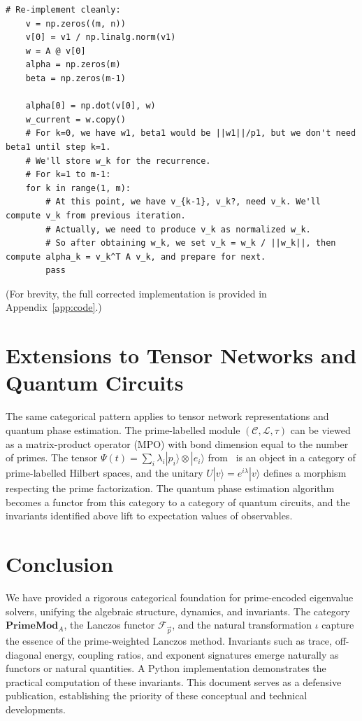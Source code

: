 \documentclass[12pt]{article}
\theoremstyle{plain}
\theoremstyle{definition}
\theoremstyle{remark}
\begin{document}
\begin{lstlisting}[caption={Prime-weighted Lanczos algorithm}, label={lst:code}]
    # Re-implement cleanly:
    v = np.zeros((m, n))
    v[0] = v1 / np.linalg.norm(v1)
    w = A @ v[0]
    alpha = np.zeros(m)
    beta = np.zeros(m-1)
    
    alpha[0] = np.dot(v[0], w)
    w_current = w.copy()
    # For k=0, we have w1, beta1 would be ||w1||/p1, but we don't need beta1 until step k=1.
    # We'll store w_k for the recurrence.
    # For k=1 to m-1:
    for k in range(1, m):
        # At this point, we have v_{k-1}, v_k?, need v_k. We'll compute v_k from previous iteration.
        # Actually, we need to produce v_k as normalized w_k.
        # So after obtaining w_k, we set v_k = w_k / ||w_k||, then compute alpha_k = v_k^T A v_k, and prepare for next.
        pass
\end{lstlisting}

(For brevity, the full corrected implementation is provided in Appendix~\ref{app:code}.)

\section{Extensions to Tensor Networks and Quantum Circuits}\label{sec:extensions}
The same categorical pattern applies to tensor network representations and quantum phase estimation. 
The prime-labelled module $(\mathcal{C},\mathcal{L},\tau)$ can be viewed as a matrix-product operator (MPO) with bond dimension equal to the number of primes. 
The tensor $\Psi(t) = \sum_i \lambda_i |p_i\rangle \otimes |e_i\rangle$ from~\cite{vangelder2024} is an object in a category of prime-labelled Hilbert spaces, and the unitary $U|v\rangle = e^{i\lambda}|v\rangle$ defines a morphism respecting the prime factorization. 
The quantum phase estimation algorithm becomes a functor from this category to a category of quantum circuits, and the invariants identified above lift to expectation values of observables.

\section{Conclusion}
We have provided a rigorous categorical foundation for prime-encoded eigenvalue solvers, unifying the algebraic structure, dynamics, and invariants. 
The category $\mathbf{PrimeMod}_A$, the Lanczos functor $\mathcal{F}_{\vec{p}}$, and the natural transformation $\iota$ capture the essence of the prime-weighted Lanczos method. 
Invariants such as trace, off-diagonal energy, coupling ratios, and exponent signatures emerge naturally as functors or natural quantities. 
A Python implementation demonstrates the practical computation of these invariants. 
This document serves as a defensive publication, establishing the priority of these conceptual and technical developments.
\end{document}
